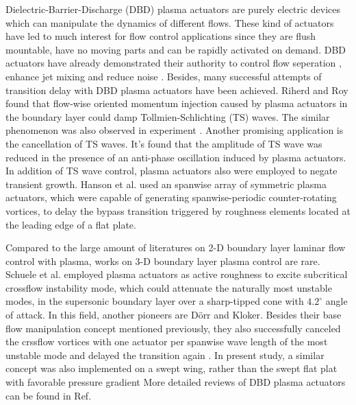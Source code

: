 \documentclass{AIAA}
\begin{document}
Dielectric-Barrier-Discharge (DBD) plasma actuators are purely electric devices which can manipulate the dynamics of different flows. These kind of actuators have led to much interest for flow control applications since they are flush mountable, have no moving parts and can be rapidly activated on demand. DBD actuators have already demonstrated their authority to control flow seperation \cite{Little2010,Mclaughlin2006,Benard2011,Kelley2012,Schneck2014,Jukes2009}, enhance jet mixing \cite{Benard2008} and reduce noise \cite{Thomas2008}. Besides, many successful attempts of transition delay with DBD plasma actuators have been achieved. Riherd and Roy \cite{Riherd2013} found that flow-wise oriented momentum injection caused by plasma actuators in the boundary layer could damp Tollmien-Schlichting (TS) waves. The similar phenomenon was also observed in experiment \cite{Duchmann2014,Grundmann2007a}. Another promising application is the cancellation of TS waves\cite{Grundmann2008,Kurz2014,Kotsonis2013}. It's found that the amplitude of TS wave was reduced in the presence of an anti-phase oscillation induced by plasma actuators. In addition of TS wave control, plasma actuators also were employed to negate transient growth. Hanson et al. \cite{Hanson2010,Hanson2014} used an spanwise array of symmetric plasma actuators, which were capable of generating spanwise-periodic counter-rotating vortices, to delay the bypass transition triggered by roughness elements located at the leading edge of a flat plate.

Compared to the large amount of literatures on 2-D boundary layer laminar flow control with plasma, works on 3-D boundary layer plasma control are rare. Schuele et al. \cite{schuele2013control} employed plasma actuators as active roughness to excite subcritical crossflow instability mode, which could attenuate the naturally most unstable modes, in the supersonic boundary layer over a sharp-tipped cone with $4.2^{\circ}$ angle of attack. In this field, another pioneers are D\"orr and Kloker. Besides their base flow manipulation concept mentioned previously, they also successfully canceled the crssflow vortices with one actuator per spanwise wave length of the most unstable mode and delayed the transition again \cite{dorr2016}. In present study, a similar concept was also implemented on a swept wing, rather than the swept flat plat with favorable pressure gradient%
 More detailed reviews of DBD plasma actuators can be found in Ref.\cite{Moreau2007,Corke2010,Benard2014}
\end{document}
